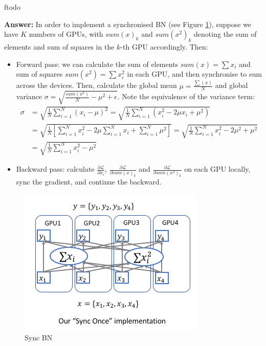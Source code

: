 ƒtodo\documentclass{article}
\newenvironment{QandA}{\begin{enumerate}[label=\arabic*.]}{\end{enumerate}}
\newenvironment{answer}{\par\normalfont \textbf{Answer:}}{}
\begin{document}
\begin{QandA}
\begin{answer}
        In order to implement a synchronised BN (see Figure \ref{fig:sync-bn}), suppose we have $K$ numbers of GPUs, with $sum(x)_k$ and $sum(x^2)_k$ denoting the sum of elements and sum of squares in the $k$-th GPU accordingly. Then:
        \begin{itemize}
            \item Forward pass: we can calculate the sum of elements $sum(x) = \sum{x_i}$ and sum of squares $sum(x^2) = \sum x_i^2$ in each GPU, and then synchronise to sum across the devices. Then, calculate the global mean $\mu = \frac{\sum(x)}{N}$ and global variance $\sigma = \sqrt{\frac{sum(x^2)}{N} - \mu^2 + \epsilon}$. Note the equivalence of the variance term:
            \begin{align*}
                \sigma &= \sqrt{\frac{1}{N} \sum_{i=1}^N \left(x_i - \mu \right)^2} 
                = \sqrt{\frac{1}{N} \sum_{i=1}^N \left( x_i^2 - 2\mu x_i + \mu^2  \right)} \\
                &= \sqrt{\frac{1}{N} \left[ \sum_{i=1}^N x_i^2 - 2 \mu \sum_{i=1}^N x_i + \sum_{i=1}^N \mu^2 \right]} 
                = \sqrt{\frac{1}{N} \sum_{i=1}^N x_i^2 - 2\mu^2 + \mu^2} \\
                &=  \sqrt{\frac{1}{N} \sum_{i=1}^N x_i^2 - \mu^2}
            \end{align*}

            \item Backward pass: calculate $\frac{\partial \mathcal{L}}{\partial x_i}$, $\frac{\partial \mathcal{L}}{\partial sum(x)_k}$ and $\frac{\partial \mathcal{L}}{\partial sum(x^2)_k}$ on each GPU locally, sync the gradient, and continue the backward. 
        \end{itemize}

        \begin{figure}[h!]
            \centering
            \includegraphics[width=0.7\linewidth]{img/sync-bn.png}
            \caption{Sync BN\footnotemark}
            \label{fig:sync-bn}
        \end{figure}
        

\end{answer}
\end{QandA}
\end{document}
